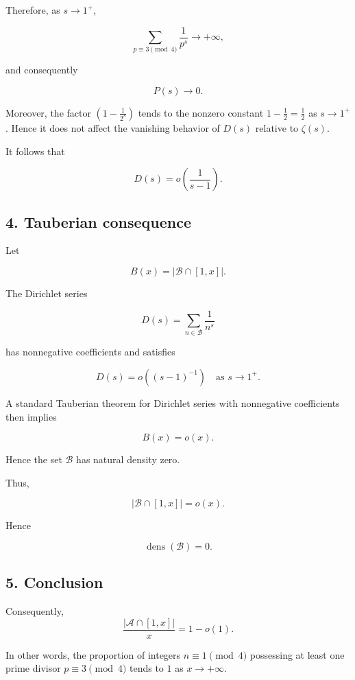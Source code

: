 \documentclass[12pt]{article}
\begin{document}
Therefore, as \(s \to 1^+\),

\[
\sum_{p \equiv 3 \pmod{4}} \frac{1}{p^s} \longrightarrow +\infty,
\]

and consequently

\[
P(s) \longrightarrow 0.
\]

Moreover, the factor \(\left(1 - \frac{1}{2^s}\right)\) tends to the nonzero constant \(1 - \frac{1}{2} = \frac{1}{2}\) as \(s \to 1^+\). Hence it does not affect the vanishing behavior of \(D(s)\) relative to \(\zeta(s)\).

It follows that

\[
D(s) = o\!\left(\frac{1}{s-1}\right).
\]






\subsection*{4. Tauberian consequence}

Let

\[
B(x)=|\mathcal{B}\cap[1,x]|.
\]

The Dirichlet series

\[
D(s)=\sum_{n\in\mathcal{B}}\frac1{n^s}
\]

has nonnegative coefficients and satisfies

\[
D(s)=o((s-1)^{-1})
\quad \text{as } s\to1^+.
\]

A standard Tauberian theorem for Dirichlet series with nonnegative 
coefficients  then implies

\[
B(x)=o(x).
\]

Hence the set \(\mathcal{B}\) has natural density zero.



Thus,

\[
|\mathcal{B} \cap [1,x]| = o(x).
\]

Hence

\[
\boxed{\operatorname{dens}(\mathcal{B}) = 0.}
\]

\subsection*{5. Conclusion}

Consequently,
\[
\frac{|\mathcal{A} \cap [1,x]|}{x} = 1 - o(1).
\]

In other words, the proportion of integers \(n \equiv 1 \pmod{4}\) possessing at least one prime divisor \(p \equiv 3 \pmod{4}\) tends to \(1\) as \(x \to +\infty\). 
\end{document}
